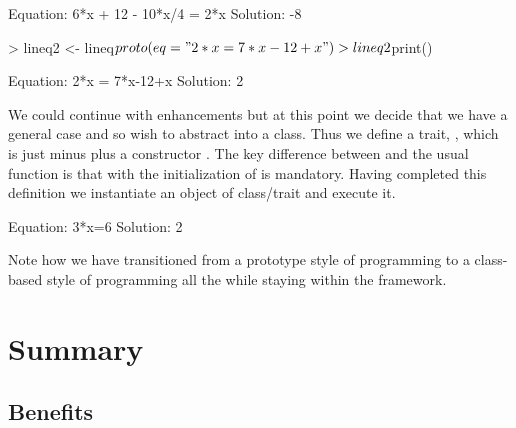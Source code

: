 \documentclass{Z}
\begin{document}
\begin{Schunk}
\begin{Soutput}
Equation: 6*x + 12 - 10*x/4 = 2*x Solution: -8 
\end{Soutput}
\begin{Sinput}
> lineq2 <- lineq$proto(eq = "2*x = 7*x-12+x")
> lineq2$print()
\end{Sinput}
\begin{Soutput}
Equation: 2*x = 7*x-12+x Solution: 2 
\end{Soutput}
\end{Schunk}

We could continue with enhancements but at this point we decide that we
have a general case and so wish
to abstract  into a class.  Thus we define a trait,
, which is just  minus  plus
a constructor .  The key difference between 
and the usual  function
is that with  the initialization of  is mandatory.
Having completed this definition
we instantiate an object of
class/trait  and execute it.

\begin{Schunk}
\begin{Soutput}
Equation: 3*x=6 Solution: 2 
\end{Soutput}
\end{Schunk}

Note how we have transitioned from a prototype style of programming
to a class-based style of programming all the while staying within
the  framework.

\section{Summary} \label{sec:summary}

\subsection{Benefits}
\label{sec:benefits}
\end{document}
